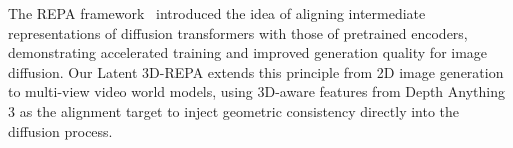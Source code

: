 The REPA framework~\cite{yu2024repa} introduced the idea of aligning intermediate representations of diffusion transformers with those of pretrained encoders, demonstrating accelerated training and improved generation quality for image diffusion. Our Latent 3D-REPA extends this principle from 2D image generation to multi-view video world models, using 3D-aware features from Depth Anything 3 as the alignment target to inject geometric consistency directly into the diffusion process.





